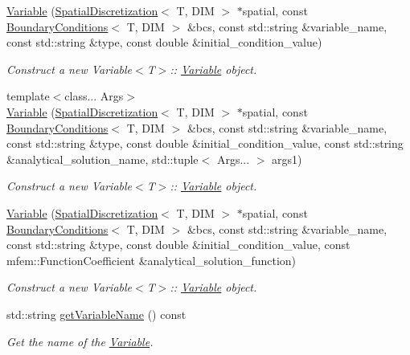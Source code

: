 \begin{DoxyCompactItemize}
\hyperlink{classVariable_a0c551085b55e12b7a8857a36a30800ca}{Variable} (\hyperlink{classSpatialDiscretization}{Spatial\+Discretization}$<$ T, D\+IM $>$ $\ast$spatial, const \hyperlink{classBoundaryConditions}{Boundary\+Conditions}$<$ T, D\+IM $>$ \&bcs, const std\+::string \&variable\+\_\+name, const std\+::string \&type, const double \&initial\+\_\+condition\+\_\+value)
\begin{DoxyCompactList}\small\item\em Construct a new Variable$<$\+T$>$\+:\+: \hyperlink{classVariable}{Variable} object. \end{DoxyCompactList}\item 
{\footnotesize template$<$class... Args$>$ }\\\hyperlink{classVariable_a13880f54dc9566203a255f382414d393}{Variable} (\hyperlink{classSpatialDiscretization}{Spatial\+Discretization}$<$ T, D\+IM $>$ $\ast$spatial, const \hyperlink{classBoundaryConditions}{Boundary\+Conditions}$<$ T, D\+IM $>$ \&bcs, const std\+::string \&variable\+\_\+name, const std\+::string \&type, const double \&initial\+\_\+condition\+\_\+value, const std\+::string \&analytical\+\_\+solution\+\_\+name, std\+::tuple$<$ Args... $>$ args1)
\begin{DoxyCompactList}\small\item\em Construct a new Variable$<$\+T$>$\+:\+: \hyperlink{classVariable}{Variable} object. \end{DoxyCompactList}\item 
\hyperlink{classVariable_a531d2baa3e77f94f1748bf6e0909627f}{Variable} (\hyperlink{classSpatialDiscretization}{Spatial\+Discretization}$<$ T, D\+IM $>$ $\ast$spatial, const \hyperlink{classBoundaryConditions}{Boundary\+Conditions}$<$ T, D\+IM $>$ \&bcs, const std\+::string \&variable\+\_\+name, const std\+::string \&type, const double \&initial\+\_\+condition\+\_\+value, const mfem\+::\+Function\+Coefficient \&analytical\+\_\+solution\+\_\+function)
\begin{DoxyCompactList}\small\item\em Construct a new Variable$<$\+T$>$\+:\+: \hyperlink{classVariable}{Variable} object. \end{DoxyCompactList}\item 
std\+::string \hyperlink{classVariable_a32906242d5d4354c2b1b6cfd852d7c2c}{get\+Variable\+Name} () const
\begin{DoxyCompactList}\small\item\em Get the name of the \hyperlink{classVariable}{Variable}. \end{DoxyCompactList}\item 

\end{DoxyCompactItemize}
